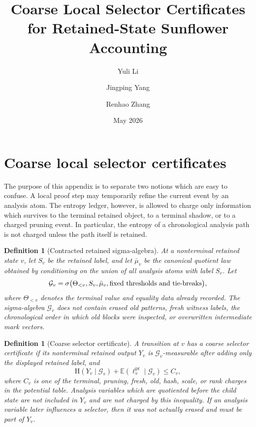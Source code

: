 \documentclass[11pt]{article}
\title{Coarse Local Selector Certificates for Retained-State Sunflower Accounting}
\author{Yuli Li \and Jingping Yang \and Renhao Zhang}
\date{May 2026}
\newtheorem{definition}[theorem]{Definition}
\theoremstyle{remark}
\newcommand{\G}{\mathcal G}
\newcommand{\E}{\mathbb E}
\newcommand{\HH}{\mathrm H}
\newcommand{\pr}{\mathrm{pr}}
\begin{document}
\maketitle

\section{Coarse local selector certificates}

The purpose of this appendix is to separate two notions which are easy to confuse.  A local proof step may temporarily refine the current event by an analysis atom.  The entropy ledger, however, is allowed to charge only information which survives to the terminal retained object, to a terminal shadow, or to a charged pruning event.  In particular, the entropy of a chronological analysis path is not charged unless the path itself is retained.

\begin{definition}[Contracted retained sigma-algebra]\label{def:coarse-filtration}
At a nonterminal retained state $v$, let $S_v$ be the retained label, and let $\bar\mu_v$ be the canonical quotient law obtained by conditioning on the union of all analysis atoms with label $S_v$.  Let
\[
        \G_v=\sigma\bigl(\Theta_{<v},S_v,\bar\mu_v,\hbox{fixed thresholds and tie-breaks}\bigr),
\]
where $\Theta_{<v}$ denotes the terminal value and equality data already recorded.  The sigma-algebra $\G_v$ does not contain erased old patterns, fresh witness labels, the chronological order in which old blocks were inspected, or overwritten intermediate mark vectors.
\end{definition}

\begin{definition}[Coarse selector certificate]\label{def:coarse-certificate}
A transition at $v$ has a coarse selector certificate if its nonterminal retained output $Y_v$ is $\G_v$-measurable after adding only the displayed retained label, and
\[
        \HH(Y_v\mid \G_v) + \E(\ell_v^{\pr}\mid \G_v)
        \le C_v,
\]
where $C_v$ is one of the terminal, pruning, fresh, old, hash, scale, or rank charges in the potential table.  Analysis variables which are quotiented before the child state are not included in $Y_v$ and are not charged by this inequality.  If an analysis variable later influences a selector, then it was not actually erased and must be part of $Y_v$.
\end{definition}
\end{document}
